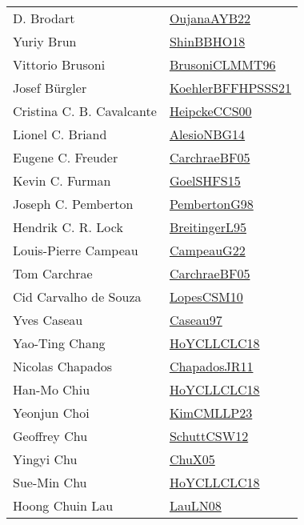 {\begin{longtable}{p{4cm}p{20cm}}
D. Brodart & \href{papers/OujanaAYB22.pdf}{OujanaAYB22}\cite{OujanaAYB22} \\
Yuriy Brun & \href{articles/ShinBBHO18.pdf}{ShinBBHO18}\cite{ShinBBHO18} \\
Vittorio Brusoni & \href{papers/BrusoniCLMMT96.pdf}{BrusoniCLMMT96}\cite{BrusoniCLMMT96} \\
Josef B{\"{u}}rgler & \href{articles/KoehlerBFFHPSSS21.pdf}{KoehlerBFFHPSSS21}\cite{KoehlerBFFHPSSS21} \\
Cristina C. B. Cavalcante & \href{articles/HeipckeCCS00.pdf}{HeipckeCCS00}\cite{HeipckeCCS00} \\
Lionel C. Briand & \href{papers/AlesioNBG14.pdf}{AlesioNBG14}\cite{AlesioNBG14} \\
Eugene C. Freuder & \href{papers/CarchraeBF05.pdf}{CarchraeBF05}\cite{CarchraeBF05} \\
Kevin C. Furman & \href{articles/GoelSHFS15.pdf}{GoelSHFS15}\cite{GoelSHFS15} \\
Joseph C. Pemberton & \href{papers/PembertonG98.pdf}{PembertonG98}\cite{PembertonG98} \\
Hendrik C. R. Lock & \href{}{BreitingerL95}\cite{BreitingerL95} \\
Louis{-}Pierre Campeau & \href{articles/CampeauG22.pdf}{CampeauG22}\cite{CampeauG22} \\
Tom Carchrae & \href{papers/CarchraeBF05.pdf}{CarchraeBF05}\cite{CarchraeBF05} \\
Cid Carvalho de Souza & \href{articles/LopesCSM10.pdf}{LopesCSM10}\cite{LopesCSM10} \\
Yves Caseau & \href{papers/Caseau97.pdf}{Caseau97}\cite{Caseau97} \\
Yao{-}Ting Chang & \href{papers/HoYCLLCLC18.pdf}{HoYCLLCLC18}\cite{HoYCLLCLC18} \\
Nicolas Chapados & \href{papers/ChapadosJR11.pdf}{ChapadosJR11}\cite{ChapadosJR11} \\
Han{-}Mo Chiu & \href{papers/HoYCLLCLC18.pdf}{HoYCLLCLC18}\cite{HoYCLLCLC18} \\
Yeonjun Choi & \href{papers/KimCMLLP23.pdf}{KimCMLLP23}\cite{KimCMLLP23} \\
Geoffrey Chu & \href{papers/SchuttCSW12.pdf}{SchuttCSW12}\cite{SchuttCSW12} \\
Yingyi Chu & \href{papers/ChuX05.pdf}{ChuX05}\cite{ChuX05} \\
Sue{-}Min Chu & \href{papers/HoYCLLCLC18.pdf}{HoYCLLCLC18}\cite{HoYCLLCLC18} \\
Hoong Chuin Lau & \href{papers/LauLN08.pdf}{LauLN08}\cite{LauLN08} \\

\end{longtable}}
